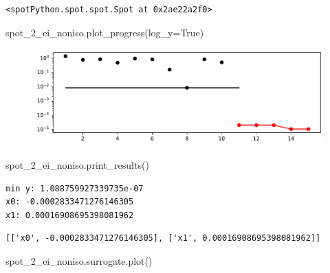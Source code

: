 \documentclass[
  letterpaper,
  DIV=11,
  numbers=noendperiod]{scrreprt}
\newenvironment{Shaded}{\begin{snugshade}}{\end{snugshade}}
\newcommand{\NormalTok}[1]{\textcolor[rgb]{0.00,0.23,0.31}{#1}}
\newcommand{\OperatorTok}[1]{\textcolor[rgb]{0.37,0.37,0.37}{#1}}
\newcommand{\VariableTok}[1]{\textcolor[rgb]{0.07,0.07,0.07}{#1}}
\begin{document}
\begin{verbatim}
<spotPython.spot.spot.Spot at 0x2ae22a2f0>
\end{verbatim}

\begin{Shaded}
\begin{Highlighting}[]
\NormalTok{spot\_2\_ei\_noniso.plot\_progress(log\_y}\OperatorTok{=}\VariableTok{True}\NormalTok{)}
\end{Highlighting}
\end{Shaded}

\begin{figure}[H]

{\centering \includegraphics{012_num_spot_ei_files/figure-pdf/cell-15-output-1.pdf}

}

\end{figure}

\begin{Shaded}
\begin{Highlighting}[]
\NormalTok{spot\_2\_ei\_noniso.print\_results()}
\end{Highlighting}
\end{Shaded}

\begin{verbatim}
min y: 1.088759927339735e-07
x0: -0.0002833471276146305
x1: 0.00016908695398081962
\end{verbatim}

\begin{verbatim}
[['x0', -0.0002833471276146305], ['x1', 0.00016908695398081962]]
\end{verbatim}

\begin{Shaded}
\begin{Highlighting}[]
\NormalTok{spot\_2\_ei\_noniso.surrogate.plot()}
\end{Highlighting}
\end{Shaded}
\end{document}
